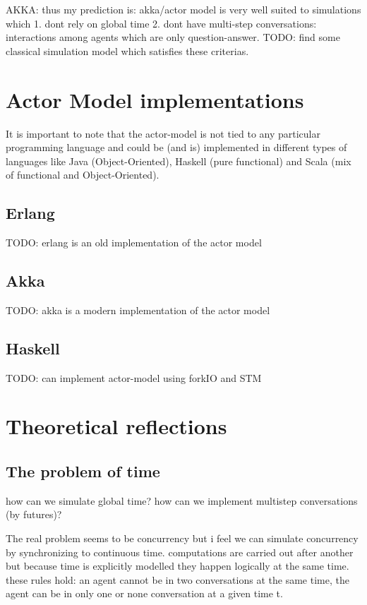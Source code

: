\documentclass{article}
\begin{document}
AKKA: thus my prediction is: akka/actor model is very well suited to simulations which 1. dont rely on global time 2. dont have multi-step conversations: interactions among agents which are only question-answer. TODO: find some classical simulation model which satisfies these criterias.

\section{Actor Model implementations}
It is important to note that the actor-model is not tied to any particular programming language and could be (and is) implemented in different types of languages like Java (Object-Oriented), Haskell (pure functional) and Scala (mix of functional and Object-Oriented).

\subsection{Erlang}
TODO: erlang is an old implementation of the actor model

\subsection{Akka}
TODO: akka is a modern implementation of the actor model

\subsection{Haskell}
TODO: can implement actor-model using forkIO and STM


\section{Theoretical reflections}

\subsection{The problem of time}
 how can we simulate global time? how can we implement multistep conversations (by futures)?

The real problem seems to be concurrency but i feel we can simulate concurrency by synchronizing to continuous time. computations are carried out after another but because time is explicitly modelled they happen logically at the same time. these rules hold: an agent cannot be in two conversations at the same time, the agent can be in only one or none conversation at a given time t.
\end{document}
